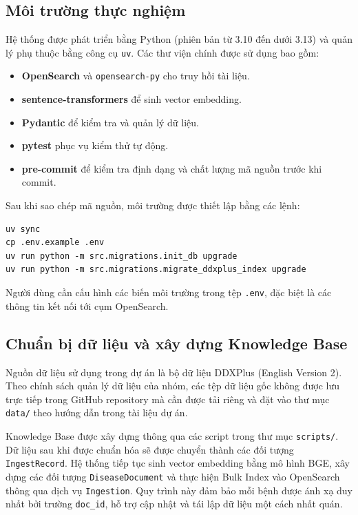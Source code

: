 \subsection{Môi trường thực nghiệm}

Hệ thống được phát triển bằng Python (phiên bản từ 3.10 đến dưới 3.13) và quản lý phụ thuộc bằng công cụ \texttt{uv}. Các thư viện chính được sử dụng bao gồm:

\begin{itemize}
    \item \textbf{OpenSearch} và \texttt{opensearch-py} cho truy hồi tài liệu.
    \item \textbf{sentence-transformers} để sinh vector embedding.
    \item \textbf{Pydantic} để kiểm tra và quản lý dữ liệu.
    \item \textbf{pytest} phục vụ kiểm thử tự động.
    \item \textbf{pre-commit} để kiểm tra định dạng và chất lượng mã nguồn trước khi commit.
\end{itemize}

Sau khi sao chép mã nguồn, môi trường được thiết lập bằng các lệnh:

\begin{verbatim}
uv sync
cp .env.example .env
uv run python -m src.migrations.init_db upgrade
uv run python -m src.migrations.migrate_ddxplus_index upgrade
\end{verbatim}

Người dùng cần cấu hình các biến môi trường trong tệp \texttt{.env}, đặc biệt là các thông tin kết nối tới cụm OpenSearch.

\subsection{Chuẩn bị dữ liệu và xây dựng Knowledge Base}

Nguồn dữ liệu sử dụng trong dự án là bộ dữ liệu DDXPlus (English Version 2). Theo chính sách quản lý dữ liệu của nhóm, các tệp dữ liệu gốc không được lưu trực tiếp trong GitHub repository mà cần được tải riêng và đặt vào thư mục \texttt{data/} theo hướng dẫn trong tài liệu dự án.

Knowledge Base được xây dựng thông qua các script trong thư mục \texttt{scripts/}. Dữ liệu sau khi được chuẩn hóa sẽ được chuyển thành các đối tượng \texttt{IngestRecord}. Hệ thống tiếp tục sinh vector embedding bằng mô hình BGE, xây dựng các đối tượng \texttt{DiseaseDocument} và thực hiện Bulk Index vào OpenSearch thông qua dịch vụ \texttt{Ingestion}. Quy trình này đảm bảo mỗi bệnh được ánh xạ duy nhất bởi trường \texttt{doc\_id}, hỗ trợ cập nhật và tái lập dữ liệu một cách nhất quán.


